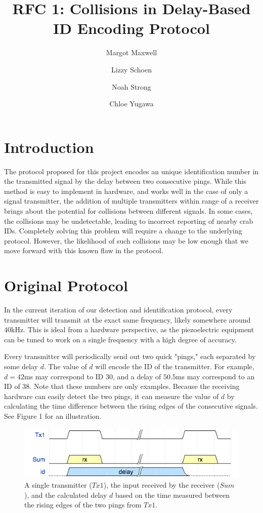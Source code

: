 \documentclass[12pt]{article}
\title{RFC 1: Collisions in Delay-Based ID Encoding Protocol}
\author{
	Margot Maxwell \and
	Lizzy Schoen \and
	Noah Strong \and
	Chloe Yugawa
}
\begin{document}
\maketitle

\tableofcontents{}


\section{Introduction}

The protocol proposed for this project encodes an unique identification number
in the transmitted signal by the delay between two consecutive pings.
While this method is easy to implement in hardware, and works well in the case
of only a signal transmitter, the addition of multiple transmitters within range
of a receiver brings about the potential for collisions between different
signals.
In some cases, the collisions may be undetectable, leading to incorrect
reporting of nearby crab IDs.
Completely solving this problem will require a change to the underlying
protocol.
However, the likelihood of such collisions may be low enough that we move
forward with this known flaw in the protocol.

\section{Original Protocol}

In the current iteration of our detection and identification protocol, every
transmitter will transmit at the exact same frequency, likely somewhere around
40kHz. This is ideal from a hardware perspective, as the piezoelectric
equipment can be tuned to work on a single frequency with a high degree of
accuracy.

Every transmitter will periodically send out two quick "pings," each separated
by some delay $d$. The value of $d$ will encode the ID of the transmitter.
For example, $d=42$ms may correspond to ID 30, and a delay of $50.5$ms may
correspond to an ID of 38.
Note that these numbers are only examples.
Because the receiving hardware can easily detect the two pings, it can measure
the value of $d$ by calculating the time difference between the rising edges
of the consecutive signals. See Figure 1 for an illustration.

\begin{figure}[h]
\centering
\includegraphics[scale=0.7]{singleTx}

\caption{A single transmitter ($Tx1$), the input received by the receiver
($Sum$), and the calculated delay $d$ based on the time measured between
the rising edges of the two pings from $Tx1$.}
\end{figure}
\end{document}
